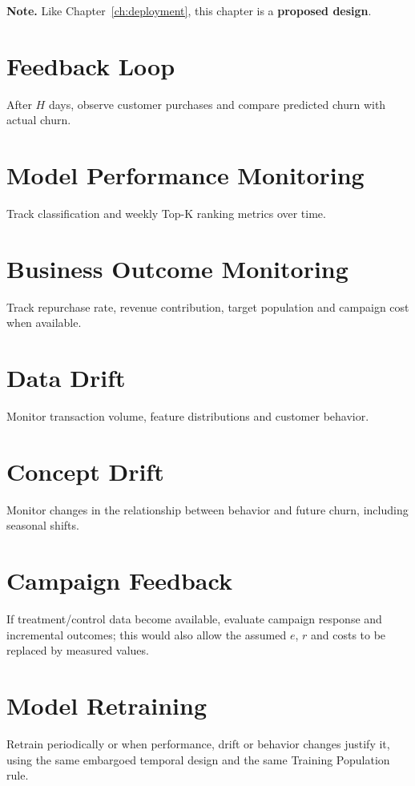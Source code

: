 \textbf{Note.} Like Chapter~\ref{ch:deployment}, this chapter is a \textbf{proposed design}.

\section{Feedback Loop}
\label{sec:9-1}

After $H$ days, observe customer purchases and compare predicted churn with actual churn.

\section{Model Performance Monitoring}
\label{sec:9-2}

Track classification and weekly Top-K ranking metrics over time.

\section{Business Outcome Monitoring}
\label{sec:9-3}

Track repurchase rate, revenue contribution, target population and campaign cost when available.

\section{Data Drift}
\label{sec:9-4}

Monitor transaction volume, feature distributions and customer behavior.

\section{Concept Drift}
\label{sec:9-5}

Monitor changes in the relationship between behavior and future churn, including seasonal shifts.

\section{Campaign Feedback}
\label{sec:9-6}

If treatment/control data become available, evaluate campaign response and incremental outcomes; this would also allow the assumed $e$, $r$ and costs to be replaced by measured values.

\section{Model Retraining}
\label{sec:9-7}

Retrain periodically or when performance, drift or behavior changes justify it, using the same embargoed temporal design and the same Training Population rule.
